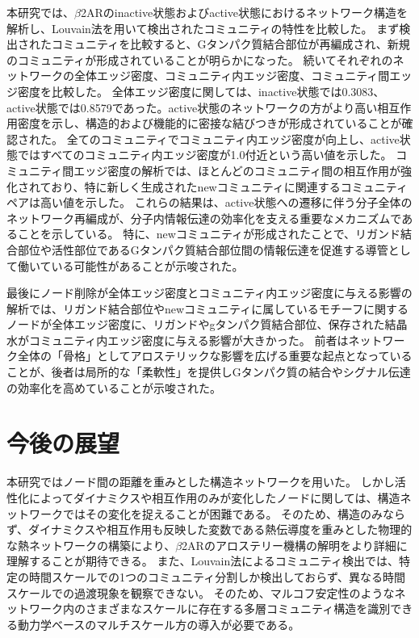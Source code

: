 本研究では、$\beta$2ARのinactive状態およびactive状態におけるネットワーク構造を解析し、Louvain法を用いて検出されたコミュニティの特性を比較した。
まず検出されたコミュニティを比較すると、Gタンパク質結合部位が再編成され、新規のコミュニティが形成されていることが明らかになった。
続いてそれぞれのネットワークの全体エッジ密度、コミュニティ内エッジ密度、コミュニティ間エッジ密度を比較した。
全体エッジ密度に関しては、inactive状態では0.3083、active状態では0.8579であった。active状態のネットワークの方がより高い相互作用密度を示し、構造的および機能的に密接な結びつきが形成されていることが確認された。
全てのコミュニティでコミュニティ内エッジ密度が向上し、active状態ではすべてのコミュニティ内エッジ密度が1.0付近という高い値を示した。
コミュニティ間エッジ密度の解析では、ほとんどのコミュニティ間の相互作用が強化されており、特に新しく生成されたnewコミュニティに関連するコミュニティペアは高い値を示した。
これらの結果は、active状態への遷移に伴う分子全体のネットワーク再編成が、分子内情報伝達の効率化を支える重要なメカニズムであることを示している。
特に、newコミュニティが形成されたことで、リガンド結合部位や活性部位であるGタンパク質結合部位間の情報伝達を促進する導管として働いている可能性があることが示唆された。

最後にノード削除が全体エッジ密度とコミュニティ内エッジ密度に与える影響の解析では、リガンド結合部位やnewコミュニティに属しているモチーフに関するノードが全体エッジ密度に、リガンドやgタンパク質結合部位、保存された結晶水がコミュニティ内エッジ密度に与える影響が大きかった。
前者はネットワーク全体の「骨格」としてアロステリックな影響を広げる重要な起点となっていることが、後者は局所的な「柔軟性」を提供しGタンパク質の結合やシグナル伝達の効率化を高めていることが示唆された。

\section{今後の展望}
本研究ではノード間の距離を重みとした構造ネットワークを用いた。
しかし活性化によってダイナミクスや相互作用のみが変化したノードに関しては、構造ネットワークではその変化を捉えることが困難である。
そのため、構造のみならず、ダイナミクスや相互作用も反映した変数である熱伝導度\cite{yamato2022computational}を重みとした物理的な熱ネットワークの構築により、$\beta$2ARのアロステリー機構の解明をより詳細に理解することが期待できる。
また、Louvain法によるコミュニティ検出では、特定の時間スケールでの1つのコミュニティ分割しか検出しておらず、異なる時間スケールでの過渡現象を観察できない。
そのため、マルコフ安定性\cite{amor2014uncovering}のようなネットワーク内のさまざまなスケールに存在する多層コミュニティ構造を識別できる動力学ベースのマルチスケール方の導入が必要である。
